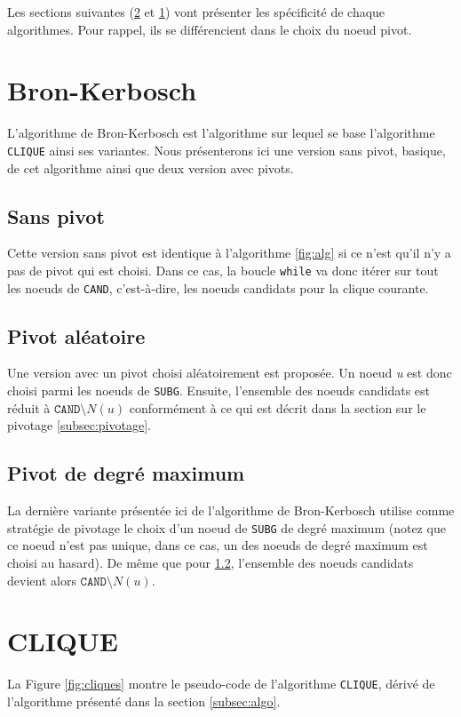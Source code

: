 \documentclass[12pt,a4paper]{article}
\begin{document}
Les sections suivantes (\ref{sec:clique} et \ref{sec:bk1}) vont présenter les spécificité de chaque algorithmes. Pour rappel, ils se différencient dans le choix du noeud pivot.

\section{Bron-Kerbosch}%
\label{sec:bk1}

L'algorithme de Bron-Kerbosch est l'algorithme sur lequel se base l'algorithme \texttt{CLIQUE} ainsi ses variantes. Nous présenterons ici une version sans pivot, basique, de cet algorithme ainsi que deux version avec pivots.

\subsection{Sans pivot}%
\label{subsec:bk}
Cette version sans pivot est identique à l'algorithme \ref{fig:alg} si ce n'est qu'il n'y a pas de pivot qui est choisi. Dans ce cas, la boucle \texttt{while} va donc itérer sur tout les noeuds de \texttt{CAND}, c'est-à-dire, les noeuds candidats pour la clique courante.

\subsection{Pivot aléatoire}%
\label{subsec:random}
Une version avec un pivot choisi aléatoirement est proposée. Un noeud \emph{u} est donc choisi parmi les noeuds de \texttt{SUBG}. Ensuite, l'ensemble des noeuds candidats est réduit à \(\texttt{CAND} \setminus N(u)\) conformément à ce qui est décrit dans la section sur le pivotage \ref{subsec:pivotage}.

\subsection{Pivot de degré maximum}%
\label{subsec:max}
La dernière variante présentée ici de l'algorithme de Bron-Kerbosch utilise comme stratégie de pivotage le choix d'un noeud de \texttt{SUBG} de degré maximum (notez que ce noeud n'est pas unique, dans ce cas, un des noeuds de degré maximum est choisi au hasard). De même que pour \ref{subsec:random}, l'ensemble des noeuds candidats devient alors \(\texttt{CAND} \setminus N(u)\).


\section{CLIQUE}
\label{sec:clique}
La Figure \ref{fig:cliques} montre le pseudo-code de l'algorithme \texttt{CLIQUE}, dérivé de l'algorithme présenté dans la section \ref{subsec:algo}.
\end{document}
